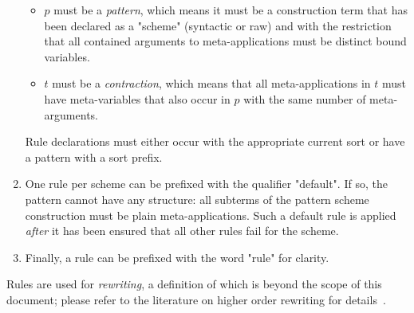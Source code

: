 \documentclass[11pt]{article} %
\begin{document}
\begin{manual}
\begin{enumerate}
\begin{itemize}
    \item $p$ must be a \emph{pattern}, which means it must be a construction term that has been
      declared as a "scheme" (syntactic or raw) and with the restriction that all contained
      arguments to meta-applications must be distinct bound variables.
      
    \item $t$ must be a \emph{contraction}, which means that all meta-applications in $t$ must have
      meta-variables that also occur in $p$ with the same number of meta-arguments.

    \end{itemize}
    Rule declarations must either occur with the appropriate current sort or have a pattern with a
    sort prefix.

  \item One rule per scheme can be prefixed with the qualifier "default". If so, the pattern cannot
    have any structure: all subterms of the pattern scheme construction must be plain
    meta-applications. Such a default rule is applied \emph{after} it has been ensured that all
    other rules fail for the scheme.

  \item Finally, a rule can be prefixed with the word "rule" for clarity.

  \end{enumerate}
  Rules are used for \emph{rewriting}, a definition of which is beyond the scope of this document;
  please refer to the literature on higher order rewriting for details~\cite{Jouannaud:klop2005,Klop+:tcs1993}.
\end{manual}
\end{document}
